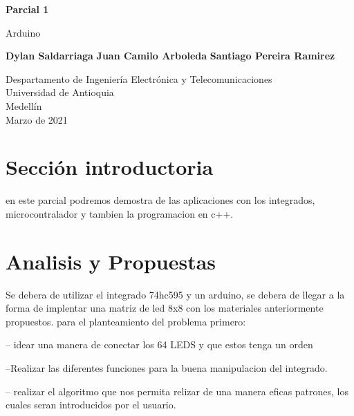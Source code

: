 \documentclass{article}
\begin{document}
\begin{titlepage}
    \begin{center}
        \vspace*{1cm}
            
        \Huge
        \textbf{Parcial 1}
            
        \vspace{0.5cm}
        \LARGE
        Arduino
            
        \vspace{1.5cm}
            
        \textbf{Dylan Saldarriaga}
         \textbf{Juan Camilo Arboleda}
         \textbf{Santiago Pereira Ramirez}
       
        \vfill
            
        \vspace{0.8cm}
            
        \Large
        Despartamento de Ingeniería Electrónica y Telecomunicaciones\\
        Universidad de Antioquia\\
        Medellín\\
        Marzo de 2021
            
    \end{center}
\end{titlepage}

\tableofcontents
\newpage
\section{Sección introductoria}\label{intro}
en este parcial podremos demostra de las aplicaciones con los integrados, microcontralador y tambien la programacion en c++.

\section{Analisis y Propuestas} \label{contenido}

Se debera de utilizar el integrado 74hc595 y un arduino, se debera de llegar a la forma de implentar una matriz de led 8x8 con los materiales anteriormente propuestos. 
para el planteamiento del problema primero:

-- idear una manera de conectar los 64 LEDS y que estos tenga un orden

--Realizar las diferentes funciones para la buena manipulacion del integrado.

-- realizar el algoritmo que nos permita relizar de una manera eficas patrones, los cuales seran introducidos por el usuario.
\end{document}
